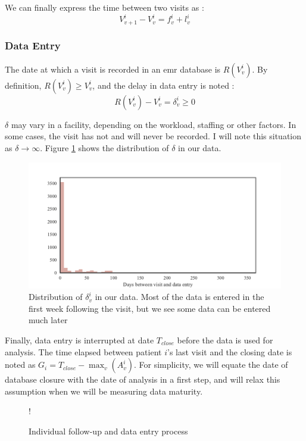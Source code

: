 We can finally express the time between two visits as :
$$V_{v+1}^i - V_v^i = f_v^i + l_v^i  $$

\subsubsection{Data Entry}

The date at which a visit is recorded in an \gls{emr} database is $R(V_v^i)$. By definition, $R(V_v^i) \geq V_v^i$, and the delay in data entry is noted :
$$R(V_v^i) - V_v^i = \delta_v^i \geq 0$$

$\delta$ may vary in a facility, depending on the workload, staffing or other factors. In some cases, the visit has not and will never be recorded. I will note this situation as $\delta \rightarrow \infty$. Figure \ref{fig:data_entry_time} shows the distribution of $\delta$ in our data.

\begin{center}
\begin{figure}[ht]
\includegraphics[width=\textwidth]{figure/data_entry_time.pdf}
\caption{Distribution of $\delta_v^i$ in our data. Most of the data is entered in the first week following the visit, but we see some data can be entered much later}
\label{fig:data_entry_time}
\end{figure}
\end{center}

Finally, data entry is interrupted at date $T_{close}$ before the data is used for analysis. The time elapsed between patient $i$'s last visit and the closing date is noted as $G_i = T_{close} - \max_v(A_v^i)$. For simplicity, we will equate the date of database closure with the date of analysis in a first step, and will relax this assumption when we will be measuring data maturity.


\begin{center}
 \begin {figure}[ht]
        \centering
\resizebox{\linewidth} {!} {

}
\caption{Individual follow-up and data entry process}
\label{fig:timeline-followup}
\end{figure}
\end{center}

